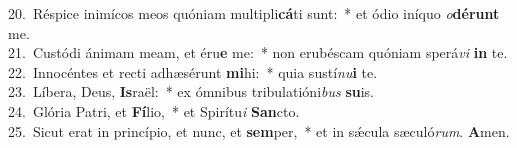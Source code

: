{20.~}Réspice inimícos meos quóniam multipli\textbf{cá}ti sunt:~* et ódio iníquo \textit{o}\textbf{dé}\textbf{runt} me.\\
{21.~}Custódi ánimam meam, et éru\textbf{e} me:~* non erubéscam quóniam sperá\textit{vi} \textbf{in} te.\\
{22.~}Innocéntes et recti adhæsérunt \textbf{mi}hi:~* quia sustí\textit{nu}\textbf{i} te.\\
{23.~}Líbera, Deus, \textbf{Is}raël:~* ex ómnibus tribulatióni\textit{bus} \textbf{su}is.\\
{24.~}Glória Patri, et \textbf{Fí}lio,~* et Spirítu\textit{i} \textbf{San}cto.\\
{25.~}Sicut erat in princípio, et nunc, et \textbf{sem}per,~* et in sǽcula sæculó\textit{rum}. \textbf{A}men.\\
